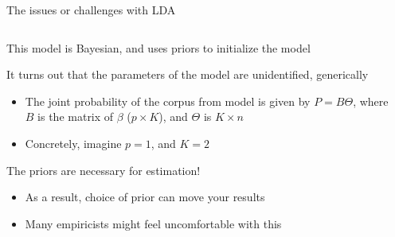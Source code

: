 \documentclass[notes,11pt, aspectratio=169]{beamer}
\newenvironment{wideitemize}{\itemize\addtolength{\itemsep}{10pt}}{\enditemize}
\begin{document}
  \begin{frame}{The issues or challenges with LDA}
    \begin{columns}[onlytextwidth, T] %
      \begin{column}{.5\textwidth}
    \begin{wideitemize}
    \item This model is Bayesian, and uses priors to initialize the model
    \item It turns out that the parameters of the model are
      unidentified, generically
      \begin{itemize}
      \item The joint probability of the corpus from model is given by
        $P = B\Theta$, where $B$ is the matrix of $\beta$
        ($p \times K$), and $\Theta$ is $K \times n$
      \item Concretely, imagine $p = 1$, and $K = 2$
      \end{itemize}
    \item The priors are necessary for estimation!
      \begin{itemize}
      \item As a result, choice of prior can move your results
      \item Many empiricists might feel uncomfortable with this        
      \end{itemize}
    \end{wideitemize}
      \end{column}%
      \hfill%
      \begin{column}{.5\textwidth}
      \end{column}%
    \end{columns}
  \end{frame}
\end{document}
